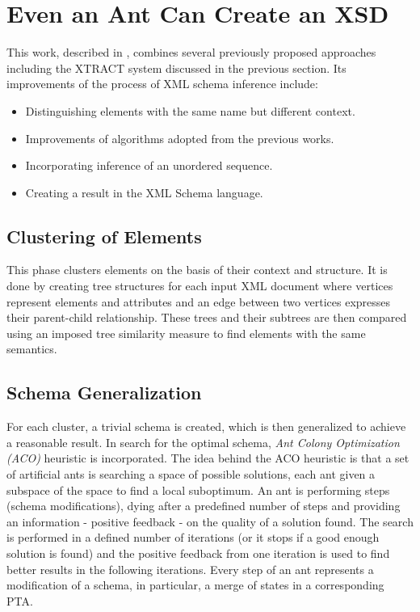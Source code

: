 \section{Even an Ant Can Create an XSD} \label{section_even_an_ant_can_create_an_xsd}
This work, described in \cite{Vosta:2008:EAC:1802514.1802522}, combines several previously proposed approaches including the XTRACT system discussed in the previous section. Its improvements of the process of XML schema inference include:

\begin{itemize}
\item Distinguishing elements with the same name but different context.
\item Improvements of algorithms adopted from the previous works.
\item Incorporating inference of an unordered sequence.
\item Creating a result in the XML Schema language.
\end{itemize}

\subsection{Clustering of Elements}
This phase clusters elements on the basis of their context and structure. It is done by creating tree structures for each input XML document where vertices represent elements and attributes and an edge between two vertices expresses their parent-child relationship. These trees and their subtrees are then compared using an imposed tree similarity measure to find elements with the same semantics.

\subsection{Schema Generalization}
For each cluster, a trivial schema is created, which is then generalized to achieve a reasonable result. In search for the optimal schema, \emph{Ant Colony Optimization (ACO)} heuristic is incorporated. The idea behind the ACO heuristic is that a set of artificial ants is searching a space of possible solutions, each ant given a subspace of the space to find a local suboptimum. An ant is performing steps (schema modifications), dying after a predefined number of steps and providing an information - positive feedback - on the quality of a solution found. The search is performed in a defined number of iterations (or it stops if a good enough solution is found) and the positive feedback from one iteration is used to find better results in the following iterations. Every step of an ant represents a modification of a schema, in particular, a merge of states in a corresponding PTA.


